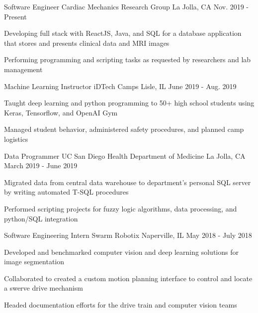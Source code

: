 
\begin{cventries}   
  \cventry
    {Software Engineer} %
    {Cardiac Mechanics Research Group} %
    {La Jolla, CA} %
    {Nov. 2019 - Present} %
    {
      \begin{cvitems} %
        \item {Developing full stack with ReactJS, Java, and SQL for a database application that stores and presents clinical data and MRI images}
        \item {Performing programming and scripting tasks as requested by researchers and lab management}
      \end{cvitems}
    }
    
  \cventry
    {Machine Learning Instructor} %
    {iDTech Camps} %
    {Lisle, IL} %
    {June 2019 - Aug. 2019} %
    {
      \begin{cvitems} %
        \item {Taught deep learning and python programming to 50+ high school students using Keras, Tensorflow, and OpenAI Gym}
        \item {Managed student behavior, administered safety procedures, and planned camp logistics}
      \end{cvitems}
    }

  \cventry
    {Data Programmer} %
    {UC San Diego Health Department of Medicine} %
    {La Jolla, CA} %
    {March 2019 - June 2019} %
    {
      \begin{cvitems} %
        \item {Migrated data from central data warehouse to department's personal SQL server by writing automated T-SQL procedures}
        \item {Performed scripting projects for fuzzy logic algorithms, data processing, and python/SQL integration}
      \end{cvitems}
    }

  \cventry
    {Software Engineering Intern} %
    {Swarm Robotix} %
    {Naperville, IL} %
    {May 2018 - July 2018} %
    {
      \begin{cvitems} %
      	\item {Developed and benchmarked computer vision and deep learning solutions for image segmentation}
        \item {Collaborated to created a custom motion planning interface to control and locate a swerve drive mechanism}
        \item {Headed documentation efforts for the drive train and computer vision teams}
      \end{cvitems}
    }


\end{cventries}
